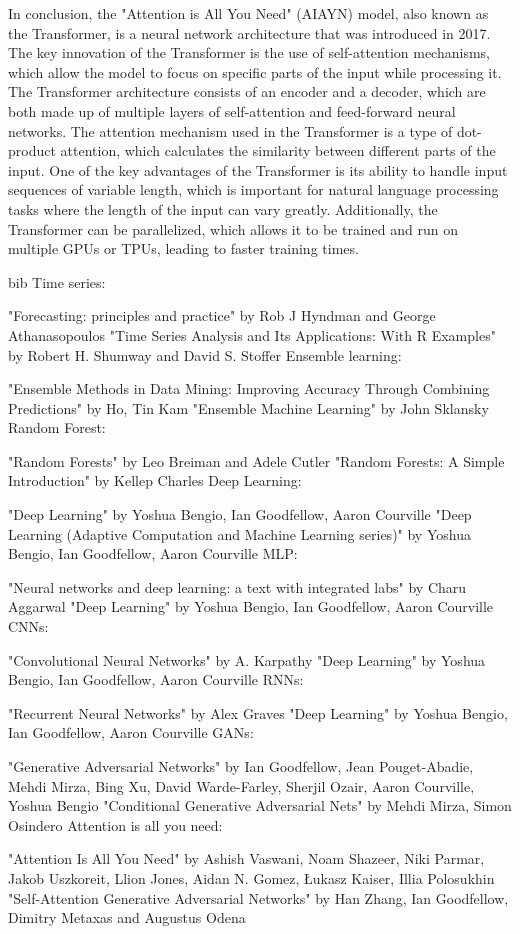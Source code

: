 In conclusion, the "Attention is All You Need" (AIAYN) model, also known as the Transformer, is a neural network architecture that was introduced in 2017.
The key innovation of the Transformer is the use of self-attention mechanisms, which allow the model to focus on specific parts of the input while processing it.
The Transformer architecture consists of an encoder and a decoder, which are both made up of multiple layers of self-attention and feed-forward neural networks.
The attention mechanism used in the Transformer is a type of dot-product attention, which calculates the similarity between different parts of the input.
One of the key advantages of the Transformer is its ability to handle input sequences of variable length, which is important for natural language processing tasks where the length of the input can vary greatly. 
Additionally, the Transformer can be parallelized, which allows it to be trained and run on multiple GPUs or TPUs, leading to faster training times.

bib
Time series:

"Forecasting: principles and practice" by Rob J Hyndman and George Athanasopoulos
"Time Series Analysis and Its Applications: With R Examples" by Robert H. Shumway and David S. Stoffer
Ensemble learning:

"Ensemble Methods in Data Mining: Improving Accuracy Through Combining Predictions" by Ho, Tin Kam
"Ensemble Machine Learning" by John Sklansky
Random Forest:

"Random Forests" by Leo Breiman and Adele Cutler
"Random Forests: A Simple Introduction" by Kellep Charles
Deep Learning:

"Deep Learning" by Yoshua Bengio, Ian Goodfellow, Aaron Courville
"Deep Learning (Adaptive Computation and Machine Learning series)" by Yoshua Bengio, Ian Goodfellow, Aaron Courville
MLP:

"Neural networks and deep learning: a text with integrated labs" by Charu Aggarwal
"Deep Learning" by Yoshua Bengio, Ian Goodfellow, Aaron Courville
CNNs:

"Convolutional Neural Networks" by A. Karpathy
"Deep Learning" by Yoshua Bengio, Ian Goodfellow, Aaron Courville
RNNs:

"Recurrent Neural Networks" by Alex Graves
"Deep Learning" by Yoshua Bengio, Ian Goodfellow, Aaron Courville
GANs:

"Generative Adversarial Networks" by Ian Goodfellow, Jean Pouget-Abadie, Mehdi Mirza, Bing Xu, David Warde-Farley, Sherjil Ozair, Aaron Courville, Yoshua Bengio
"Conditional Generative Adversarial Nets" by Mehdi Mirza, Simon Osindero
Attention is all you need:

"Attention Is All You Need" by Ashish Vaswani, Noam Shazeer, Niki Parmar, Jakob Uszkoreit, Llion Jones, Aidan N. Gomez, Łukasz Kaiser, Illia Polosukhin
"Self-Attention Generative Adversarial Networks" by Han Zhang, Ian Goodfellow, Dimitry Metaxas and Augustus Odena


